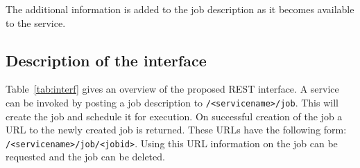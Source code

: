 \documentclass[a4paper]{article}
\begin{document}
The additional information is added to the job description as it becomes
available to the service. 

\subsection{Description of the interface}

Table~\ref{tab:interf} gives an overview of the proposed REST interface.  A
service can be invoked by posting a job description to
\texttt{/<servicename>/job}. This will create the job and schedule it for
execution. On successful creation of the job a URL to the newly created job is
returned. These URLs have the following form:
\texttt{/<servicename>/job/<jobid>}.  Using this URL information on the job can
be requested and the job can be deleted.
\end{document}
